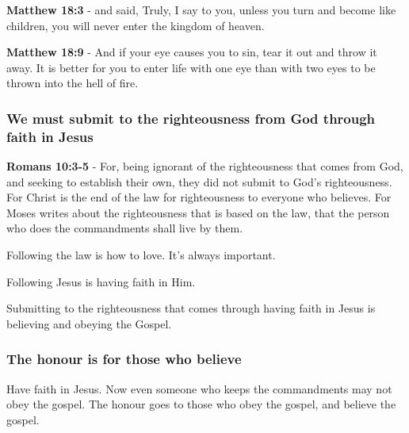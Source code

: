 \documentclass[11pt]{article}
\begin{document}
\textbf{Matthew 18:3} - and said, Truly, I say to you, unless you turn and become like children, you will never enter the kingdom of heaven.

\textbf{Matthew 18:9} - And if your eye causes you to sin, tear it out and throw it away. It is better for you to enter life with one eye than with two eyes to be thrown into the hell of fire.

\subsubsection{We must submit to the righteousness from God through faith in Jesus}
\label{sec:org8528417}
\textbf{Romans 10:3-5} - For, being ignorant of the righteousness that comes from God, and seeking to establish their own, they did not submit to God's righteousness.  For Christ is the end of the law for righteousness to everyone who believes.  For Moses writes about the righteousness that is based on the law, that the person who does the commandments shall live by them.

Following the law is how to love. It's always important.

Following Jesus is having faith in Him.

Submitting to the righteousness that comes through having faith in Jesus is believing and obeying the Gospel.

\subsubsection{The honour is for those who believe}
\label{sec:orgb4692df}
Have faith in Jesus.
Now even someone who keeps the commandments may not obey the gospel.
The honour goes to those who obey the gospel, and believe the gospel.
\end{document}
